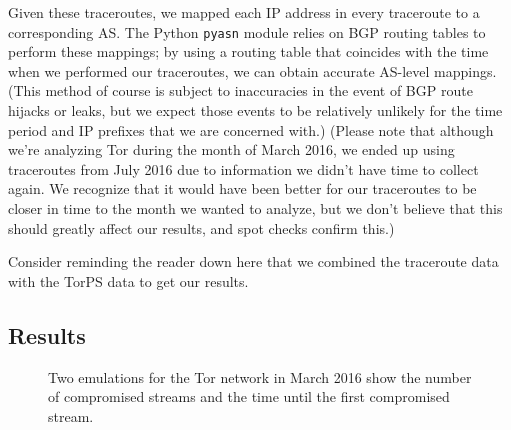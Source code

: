 Given these traceroutes, we mapped each IP address in every traceroute
to a corresponding AS.  The Python {\tt pyasn} module relies on BGP
routing tables to perform these mappings; by using a routing table that
coincides with the time when we performed our traceroutes, we can obtain
accurate AS-level mappings.  (This method of course is subject to
inaccuracies in the event of BGP route hijacks or leaks, but we expect
those events to be relatively unlikely for the time period and IP
prefixes that we are concerned with.)  (Please note that although we're 
analyzing Tor during the month of March 2016, we ended up using traceroutes from 
July 2016 due to information we didn't have time to collect again.  We recognize 
that it would have been better for our traceroutes to be closer in time to the 
month we wanted to analyze, but we don't 
believe that this should greatly affect our results, and spot checks confirm 
this.)  

Consider reminding the reader down here that we combined the traceroute data with the TorPS 
data to get our results.

\subsection{Results}

\begin{figure}[t]
\centering
{}
\caption{Two emulations for the Tor network in March 2016 show the
  number of compromised streams and the time until the first compromised
  stream.} 
\label{fig:compromise-stream-time}
\end{figure}

